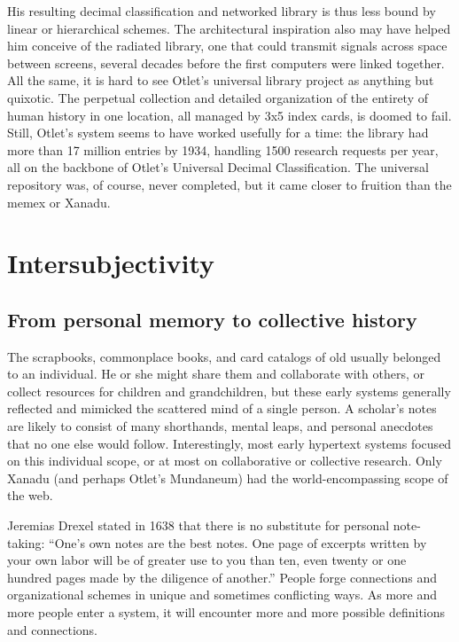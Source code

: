 His resulting decimal classification and networked library is thus less bound by linear or hierarchical schemes. The architectural inspiration also may have helped him conceive of the radiated library, one that could transmit signals across space between screens, several decades before the first computers were linked together. All the same, it is hard to see Otlet’s universal library project as anything but quixotic. The perpetual collection and detailed organization of the entirety of human history in one location, all managed by 3x5 index cards, is doomed to fail. Still, Otlet’s system seems to have worked usefully for a time: the library had more than 17 million entries by 1934, handling 1500 research requests per year, all on the backbone of Otlet’s Universal Decimal Classification.  The universal repository was, of course, never completed, but it came closer to fruition than the memex or Xanadu.

\section{Intersubjectivity}

\subsection{From personal memory to collective history}

The scrapbooks, commonplace books, and card catalogs of old usually belonged to an individual. He or she might share them and collaborate with others, or collect resources for children and grandchildren, but these early systems generally reflected and mimicked the scattered mind of a single person. A scholar’s notes are likely to consist of many shorthands, mental leaps, and personal anecdotes that no one else would follow. Interestingly, most early hypertext systems focused on this individual scope, or at most on collaborative or collective research. Only Xanadu (and perhaps Otlet’s Mundaneum) had the world-encompassing scope of the web.

Jeremias Drexel stated in 1638 that there is no substitute for personal note-taking: “One’s own notes are the best notes. One page of excerpts written by your own labor will be of greater use to you than ten, even twenty or one hundred pages made by the diligence of another.”  People forge connections and organizational schemes in unique and sometimes conflicting ways. As more and more people enter a system, it will encounter more and more possible definitions and connections.

